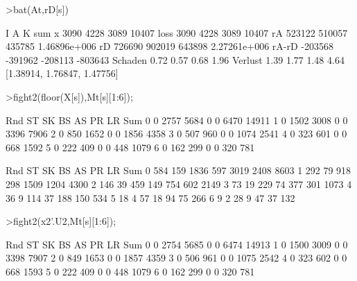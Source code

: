 \documentclass[a4paper,10pt]{article}
\begin{document}
\begin{eulernotebook}
\begin{eulerprompt}
>bat(At,rD[s])
\end{eulerprompt}
\begin{euleroutput}
                             I             A             K           sum
               x          3090          4228          3089         10407
            loss          3090          4228          3089         10407
              rA        523122        510057        435785  1.46896e+006
              rD        726690        902019        643898  2.27261e+006
           rA-rD       -203568       -391962       -208113       -803643
         Schaden          0.72          0.57          0.68          1.96
         Verlust          1.39          1.77          1.48          4.64
  [1.38914,  1.76847,  1.47756]
\end{euleroutput}
\begin{eulerprompt}
>fight2(floor(X[s]),Mt[s][1:6]);
\end{eulerprompt}
\begin{euleroutput}
       Rnd      ST      SK      BS      AS      PR      LR     Sum
         0       0    2757    5684       0       0    6470   14911
         1       0    1502    3008       0       0    3396    7906
         2       0     850    1652       0       0    1856    4358
         3       0     507     960       0       0    1074    2541
         4       0     323     601       0       0     668    1592
         5       0     222     409       0       0     448    1079
         6       0     162     299       0       0     320     781
  
       Rnd      ST      SK      BS      AS      PR      LR     Sum
         0     584     159    1836     597    3019    2408    8603
         1     292      79     918     298    1509    1204    4300
         2     146      39     459     149     754     602    2149
         3      73      19     229      74     377     301    1073
         4      36       9     114      37     188     150     534
         5      18       4      57      18      94      75     266
         6       9       2      28       9      47      37     132
\end{euleroutput}
\begin{eulerprompt}
>fight2(x2'.U2,Mt[s][1:6]);
\end{eulerprompt}
\begin{euleroutput}
       Rnd      ST      SK      BS      AS      PR      LR     Sum
         0       0    2754    5685       0       0    6474   14913
         1       0    1500    3009       0       0    3398    7907
         2       0     849    1653       0       0    1857    4359
         3       0     506     961       0       0    1075    2542
         4       0     323     602       0       0     668    1593
         5       0     222     409       0       0     448    1079
         6       0     162     299       0       0     320     781
  

\end{euleroutput}
\end{eulernotebook}
\end{document}
